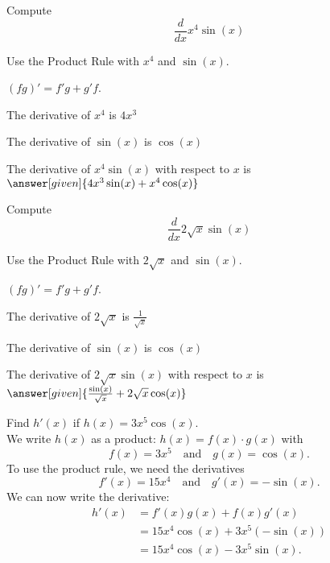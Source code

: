 \documentclass{ximera}
\begin{document}
\begin{problem} %
  Compute
  \[
  \frac{d}{dx} x^4\sin(x)
  \]
  
    \begin{hint}
      Use the Product Rule with $x^4$ and $\sin(x)$.
    \end{hint}
    \begin{hint}
      $(fg)' = f'g+g'f$.
    \end{hint}
    \begin{hint}
      The derivative of $x^4$ is $4x^3$
    \end{hint}
    \begin{hint}
      The derivative of $\sin(x)$ is $\cos(x)$
    \end{hint}
    
		The derivative of $x^4\sin(x)$ with respect to $x$ is
		 $\answer[given]{4x^3\sin(x) + x^4\cos(x)}$
		
\end{problem}


\begin{problem} %
  Compute
  \[
  \frac{d}{dx} 2\sqrt x\sin(x)
  \]
  
    \begin{hint}
      Use the Product Rule with $2\sqrt x$ and $\sin(x)$.
    \end{hint}
    \begin{hint}
      $(fg)' = f'g+g'f$.
    \end{hint}
    \begin{hint}
      The derivative of $2\sqrt x$ is $\frac{1}{\sqrt x}$
    \end{hint}
    \begin{hint}
      The derivative of $\sin(x)$ is $\cos(x)$
    \end{hint}
    
		The derivative of $2\sqrt x\sin(x)$ with respect to $x$ is
		 $\answer[given]{\frac{\sin(x)}{\sqrt x} + 2\sqrt x\cos(x)}$
		
\end{problem}


\begin{example} %
Find $h'(x)$ if $h(x) = 3x^5\cos(x)$.\\
We write $h(x)$ as a product: $h(x) = f(x)\cdot g(x)$ with
 \[f(x) = 3x^5 \quad \text{and} \quad g(x) = \cos(x).\] 
To use the product rule, we need the derivatives
\[f'(x) = 15x^4 \quad \text{and} \quad g'(x) = -\sin(x).\] 
We can now write the derivative:
\begin{align*}
h'(x) &= f'(x)g(x) + f(x)g'(x)\\
&=  15x^4 \cos(x) +3x^5(-\sin(x)) \\
&= 15x^4 \cos(x) - 3x^5\sin(x).
\end{align*}
\end{example}
\end{document}
